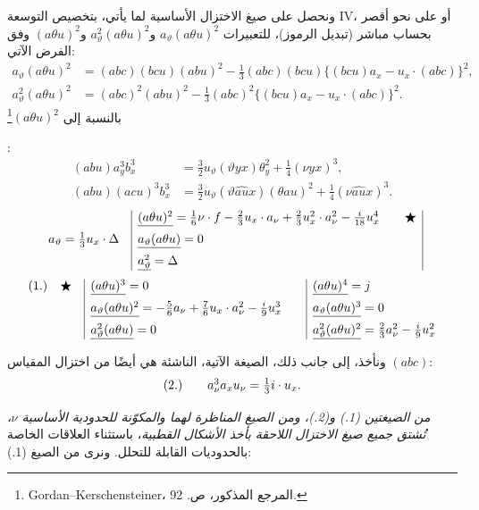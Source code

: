 \documentclass[11pt]{article}
\newcommand{\srcLTR}[1]{\relax\ifmmode\text{\mbox{\babelsublr{\foreignlanguage{english}{#1}}}}\else\babelsublr{\foreignlanguage{english}{#1}}\fi}
\newcommand{\srcfn}[2]{\begingroup\renewcommand{\thefootnote}{\srcLTR{#1}}\footnote{#2}\addtocounter{footnote}{-1}\endgroup}
\begin{document}
ونحصل على صيغ الاختزال الأساسية لما يأتي، بتخصيص التوسعة IV، أو على نحو أقصر بحساب مباشر (تبديل الرموز)، للتعبيرات $a_\vartheta(a\theta u)^2$ و$a_\vartheta^2(a\theta u)^2$ و$(a\theta u)^2$ وفق الفرض الآتي:
\[
\begin{aligned}
a_\vartheta(a\theta u)^2
&=(abc)(bcu)(abu)^2-\frac13(abc)(bcu)\{(bcu)a_x-u_x\cdot(abc)\}^2,\\
a_\vartheta^2(a\theta u)^2
&=(abc)^2(abu)^2-\frac13(abc)^2\{(bcu)a_x-u_x\cdot(abc)\}^2.
\end{aligned}
\]
بالنسبة إلى $(a\theta u)^2$\srcfn{*)}{Gordan--Kerschensteiner، المرجع المذكور، ص. 92.}:
\[
\begin{aligned}
(abu)a_y^3b_x^3&=\frac32u_\vartheta(\vartheta yx)\theta_y^2+\frac14(\nu yx)^3,\\
(abu)(acu)^3b_x^3&=\frac32u_\vartheta(\vartheta\widehat{au}x)(\theta au)^2+\frac14(\nu\widehat{au}x)^3.
\end{aligned}
\]
\begingroup\small
\[
\begin{array}{r@{\quad}|l@{\qquad}c|}
& \underline{(a\theta u)^2}=\frac16\nu\cdot f-\frac23u_x\cdot a_\nu+\frac23u_x^2\cdot a_\nu^2-\frac{i}{18}u_x^4
& \bigstar\\[0.55em]
a_\vartheta=\frac13u_x\cdot\Delta
& \underline{a_\vartheta(a\theta u)}=0
& \\[0.55em]
& \underline{a_\vartheta^2}=\Delta
&
\end{array}
\]
\vspace{-0.5em}
\[
\begin{array}{r@{\quad}c@{\quad}|l@{\qquad}|l}
(1.) & \bigstar
& \underline{(a\theta u)^3}=0
& \underline{(a\theta u)^4}=j\\[0.55em]
&
& \underline{a_\vartheta(a\theta u)^2}=-\frac56a_\nu+\frac76u_x\cdot a_\nu^2-\frac{i}{9}u_x^3
& \underline{a_\vartheta(a\theta u)^3}=0\\[0.55em]
&
& \underline{a_\vartheta^2(a\theta u)}=0
& \underline{a_\vartheta^2(a\theta u)^2}=\frac23a_\nu^2-\frac{i}{9}u_x^2
\end{array}
\]
\endgroup

ونأخذ، إلى جانب ذلك، الصيغة الآتية، الناشئة هي أيضًا من اختزال المقياس $(abc)$:
\[
\begin{array}{r@{\qquad}l}
(2.) & a_\nu^3a_xu_\nu=\frac13i\cdot u_x.
\end{array}
\]

\emph{من الصيغتين (1.) و(2.)، ومن الصيغ المناظرة لهما والمكوّنة للحدودية الأساسية $\nu$، تُشتق جميع صيغ الاختزال اللاحقة بأخذ الأشكال القطبية}، باستثناء العلاقات الخاصة بالحدوديات القابلة للتحلل. ونرى من الصيغ (1.):
\end{document}
